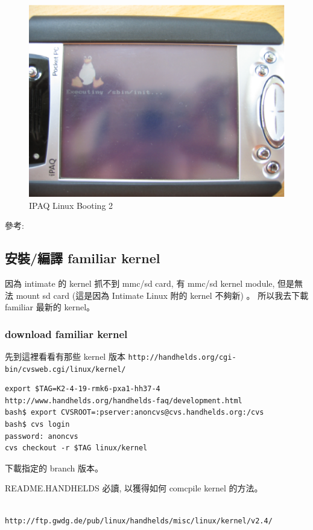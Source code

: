 \documentclass[12pt,a4paper]{article}
\begin{document}
\begin{CJK}{UTF8}{bsmi}
\begin{figure}[htbp]
\centering
\includegraphics[scale=0.5]{eps/booting_2.eps}
\caption{IPAQ Linux Booting 2}
\end{figure}

參考: \cite{intimate}

\subsection{安裝/編譯 familiar kernel}
因為 intimate 的 kernel 抓不到 mmc/sd card, 有 mmc/sd kernel module,
但是無法 mount sd card (這是因為 Intimate Linux 附的 kernel 不夠新) 。
所以我去下載 familiar 最新的 kernel。

\subsubsection{download familiar kernel}
先到這裡看看有那些 kernel 版本
\verb+http://handhelds.org/cgi-bin/cvsweb.cgi/linux/kernel/+

\begin{verbatim}
export $TAG=K2-4-19-rmk6-pxa1-hh37-4
http://www.handhelds.org/handhelds-faq/development.html
bash$ export CVSROOT=:pserver:anoncvs@cvs.handhelds.org:/cvs
bash$ cvs login
password: anoncvs
cvs checkout -r $TAG linux/kernel
\end{verbatim}
下載指定的 branch 版本。

README.HANDHELDS 必讀, 以獲得如何 comcpile kernel 的方法。


\begin{verbatim}

http://ftp.gwdg.de/pub/linux/handhelds/misc/linux/kernel/v2.4/


\end{verbatim}
\end{CJK}
\end{document}
